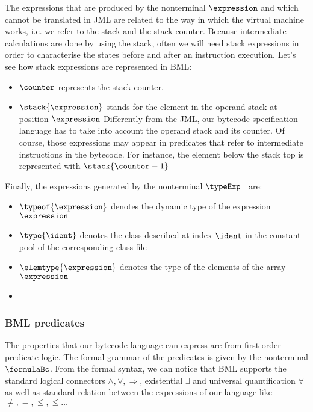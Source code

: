 The expressions that are produced by the nonterminal $\expression$ and which cannot be translated in JML are related to
 the way in which the virtual machine works, i.e. we refer to the stack and the stack counter.
Because intermediate calculations are done by using the stack, often we will need stack expressions in order to characterise the states before and after an instruction
execution. Let's see how stack expressions are represented in BML:
\begin{itemize}
      \item  $\counter$ represents the stack counter.
  \item  $\stack{ \expression}$ stands for the element in the operand stack at position $\expression$
             Differently from the JML, our bytecode specification language has to take into 
             account the operand stack and its counter. Of course, those expressions may appear in predicates that refer to intermediate instructions
	     in the bytecode. 
	     For instance, the element below the stack top is represented with $\stack{\counter - 1}$ 
 \end{itemize}

Finally, the expressions generated by the nonterminal $\typeExp$ \ are:
\begin{itemize}
   \item  $ \typeof{\expression}$  denotes the dynamic type of the expression $\expression$ 

      \item $ \type{ \ident } $  denotes the class  described at index $\ident$ in the constant pool of the corresponding class file
 
      \item $\elemtype{\expression}$ denotes the type of the elements of the array $\expression$
      \item \TYPE {}

 \end{itemize}
\subsubsection{BML predicates}
 The properties that our bytecode language can express are from first order predicate logic. The formal grammar of the predicates is
 given by the nonterminal $\formulaBc$. From the formal syntax, we can notice that BML supports the standard logical connectors
 $\wedge, \vee, \Rightarrow $, existential $\exists$ and universal quantification $\forall$ as well as standard relation between
 the  expressions of our language like $\neq, = , \leq, \le \ldots$  
 

